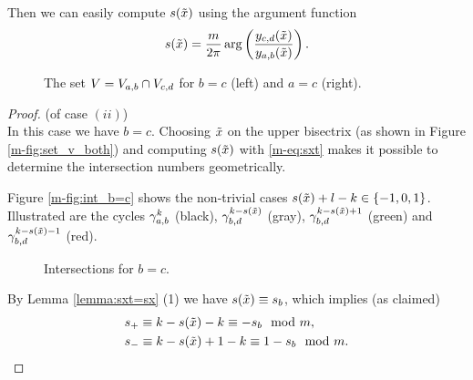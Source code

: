 \documentclass[main.tex]{subfiles}
\begin{document}
  Then we can easily compute $s(\tilde{x})$ using the argument function
  \begin{equation}\label{eq:sxt}
   s(\tilde{x}) = \frac{m}{2\pi} \arg \left( \frac{y_{c,d}(\tilde{x})}{y_{a,b}(\tilde{x})} \right).
  \end{equation}
    \begin{figure}[H]
      \begin{center}
   \scalebox{.9}{}
      \end{center}
     \vspace{-1cm}
    \caption{The set $V = V_{a,b} \cap V_{c,d}$ for $b=c$ (left) and $a=c$ (right).}
    \label{fig:set_v_both}
\end{figure}
   
   \begin{proof}\let\qed\relax (of case $(ii)$) \\
   In this case we have $b = c$. Choosing $\tilde{x}$ on the upper bisectrix (as shown in Figure \ref{m-fig:set_v_both}) 
   and computing $s(\tilde{x})$ with \eqref{m-eq:sxt} makes it possible to determine the intersection numbers geometrically.
   
   Figure \ref{m-fig:int_b=c} shows the non-trivial cases $s(\tilde{x}) + l - k \in \{-1,0,1\}$.
   Illustrated are the cycles $\gamma_{a,b}^k$ (black), $\gamma_{b,d}^{k-s(\tilde{x})}$ (gray), $\gamma_{b,d}^{k-s(\tilde{x}) + 1 }$ (green) and
    $\gamma_{b,d}^{k-s(\tilde{x})-1}$ (red).
    \begin{figure}[H]
      \begin{center}
   \scalebox{0.8}{}
      \end{center}
    \caption{Intersections for $b=c$.}
    \label{fig:int_b=c}
   \end{figure}
    By Lemma \ref{lemma:sxt=sx} (1) we have $s(\tilde{x}) \equiv s_b$, which implies (as claimed)
    \begin{align*}
    & s_+ \equiv k-s(\tilde{x})-k \equiv -s_b \mod m, \\
    & s_- \equiv k-s(\tilde{x})+1-k \equiv 1-s_b \mod m.
    \end{align*}
   \end{proof}
 
\end{document}
